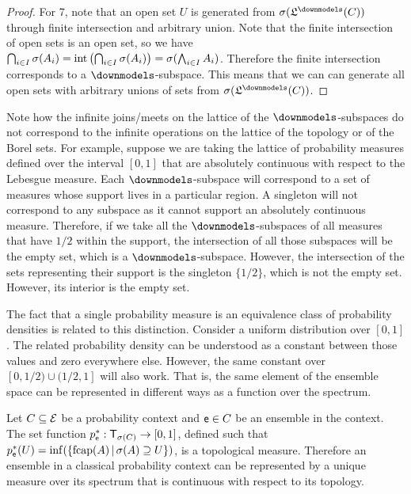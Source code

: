 \begin{mathSection}
\begin{proof}
	For 7, note that an open set $U$ is generated from $\sigma(\mathfrak{L}^\separate(C))$ through finite intersection and arbitrary union. Note that the finite intersection of open sets is an open set, so we have $\bigcap_{i \in I} \sigma(A_i) = \operatorname{int}\left(\bigcap_{i \in I} \sigma(A_i)\right) = \sigma(\bigwedge_{i \in I} A_i)$. Therefore the finite intersection corresponds to a $\separate$-subspace. This means that we can can generate all open sets with arbitrary unions of sets from $\sigma(\mathfrak{L}^\separate(C))$.
\end{proof}

\begin{remark}
	Note how the infinite joins/meets on the lattice of the $\separate$-subspaces do not correspond to the infinite operations on the lattice of the topology or of the Borel sets. For example, suppose we are taking the lattice of probability measures defined over the interval $[0,1]$ that are absolutely continuous with respect to the Lebesgue measure. Each $\separate$-subspace will correspond to a set of measures whose support lives in a particular region. A singleton will not correspond to any subspace as it cannot support an absolutely continuous measure. Therefore, if we take all the $\separate$-subspaces of all measures that have $1/2$ within the support, the intersection of all those subspaces will be the empty set, which is a $\separate$-subspace. However, the intersection of the sets representing their support is the singleton $\{1/2\}$, which is not the empty set. However, its interior is the empty set.
	
	The fact that a single probability measure is an equivalence class of probability densities is related to this distinction. Consider a uniform distribution over $[0,1]$. The related probability density can be understood as a constant between those values and zero everywhere else. However, the same constant over $[0,1/2) \cup (1/2,1]$ will also work. That is, the same element of the ensemble space can be represented in different ways as a function over the spectrum.
\end{remark}


\begin{thrm}
	Let $C \subseteq \mathcal{E}$ be a probability context and $\mathsf{e} \in C$ be an ensemble in the context. The set function $p^*_{\mathsf{e}} : \textsf{T}_{\sigma(C)} \to[0,1]$, defined such that $p^*_{\mathsf{e}}(U) = \inf(\{ \mathrm{fcap}(A) \, | \, \sigma(A) \supseteq U \})$, is a topological measure. Therefore an ensemble in a classical probability context can be represented by a unique measure over its spectrum that is continuous with respect to its topology.
\end{thrm}


\end{mathSection}
